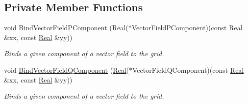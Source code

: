 \subsection*{Private Member Functions}
\begin{DoxyCompactItemize}
\item 
void \hyperlink{classmtk_1_1UniStgGrid2D_a47b92d03ef5ed2b1ed28091a424f8f52}{Bind\+Vector\+Field\+P\+Component} (\hyperlink{group__c01-roots_gac080bbbf5cbb5502c9f00405f894857d}{Real}($\ast$Vector\+Field\+P\+Component)(const \hyperlink{group__c01-roots_gac080bbbf5cbb5502c9f00405f894857d}{Real} \&xx, const \hyperlink{group__c01-roots_gac080bbbf5cbb5502c9f00405f894857d}{Real} \&yy))
\begin{DoxyCompactList}\small\item\em Binds a given component of a vector field to the grid. \end{DoxyCompactList}\item 
void \hyperlink{classmtk_1_1UniStgGrid2D_a9643167e149da2ea4e57fd12cb9f1a97}{Bind\+Vector\+Field\+Q\+Component} (\hyperlink{group__c01-roots_gac080bbbf5cbb5502c9f00405f894857d}{Real}($\ast$Vector\+Field\+Q\+Component)(const \hyperlink{group__c01-roots_gac080bbbf5cbb5502c9f00405f894857d}{Real} \&xx, const \hyperlink{group__c01-roots_gac080bbbf5cbb5502c9f00405f894857d}{Real} \&yy))
\begin{DoxyCompactList}\small\item\em Binds a given component of a vector field to the grid. \end{DoxyCompactList}\end{DoxyCompactItemize}
